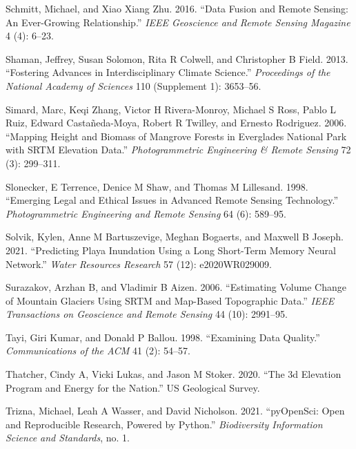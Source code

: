 \documentclass[
  12pt,
]{article}
\newlength{\cslhangindent}
\newlength{\cslentryspacingunit} %
\newenvironment{CSLReferences}[2] %
 {%
  \setlength{\parindent}{0pt}
  \ifodd #1
  \let\oldpar\par
  \def\par{\hangindent=\cslhangindent\oldpar}
  \fi
  \setlength{\parskip}{#2\cslentryspacingunit}
 }%
 {}
\begin{document}
\begin{CSLReferences}{1}{0}
\leavevmode{}%
Schmitt, Michael, and Xiao Xiang Zhu. 2016. {``Data Fusion and Remote
Sensing: An Ever-Growing Relationship.''} \emph{IEEE Geoscience and
Remote Sensing Magazine} 4 (4): 6--23.

\leavevmode{}%
Shaman, Jeffrey, Susan Solomon, Rita R Colwell, and Christopher B Field.
2013. {``Fostering Advances in Interdisciplinary Climate Science.''}
\emph{Proceedings of the National Academy of Sciences} 110 (Supplement
1): 3653--56.

\leavevmode{}%
Simard, Marc, Keqi Zhang, Victor H Rivera-Monroy, Michael S Ross, Pablo
L Ruiz, Edward Castañeda-Moya, Robert R Twilley, and Ernesto Rodriguez.
2006. {``Mapping Height and Biomass of Mangrove Forests in Everglades
National Park with SRTM Elevation Data.''} \emph{Photogrammetric
Engineering \& Remote Sensing} 72 (3): 299--311.

\leavevmode{}%
Slonecker, E Terrence, Denice M Shaw, and Thomas M Lillesand. 1998.
{``Emerging Legal and Ethical Issues in Advanced Remote Sensing
Technology.''} \emph{Photogrammetric Engineering and Remote Sensing} 64
(6): 589--95.

\leavevmode{}%
Solvik, Kylen, Anne M Bartuszevige, Meghan Bogaerts, and Maxwell B
Joseph. 2021. {``Predicting Playa Inundation Using a Long Short-Term
Memory Neural Network.''} \emph{Water Resources Research} 57 (12):
e2020WR029009.

\leavevmode{}%
Surazakov, Arzhan B, and Vladimir B Aizen. 2006. {``Estimating Volume
Change of Mountain Glaciers Using SRTM and Map-Based Topographic
Data.''} \emph{IEEE Transactions on Geoscience and Remote Sensing} 44
(10): 2991--95.

\leavevmode{}%
Tayi, Giri Kumar, and Donald P Ballou. 1998. {``Examining Data
Quality.''} \emph{Communications of the ACM} 41 (2): 54--57.

\leavevmode{}%
Thatcher, Cindy A, Vicki Lukas, and Jason M Stoker. 2020. {``The 3d
Elevation Program and Energy for the Nation.''} US Geological Survey.

\leavevmode{}%
Trizna, Michael, Leah A Wasser, and David Nicholson. 2021. {``pyOpenSci:
Open and Reproducible Research, Powered by Python.''} \emph{Biodiversity
Information Science and Standards}, no. 1.


\end{CSLReferences}
\end{document}
